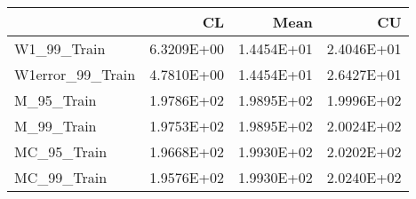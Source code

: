 \begin{tabular}{lrrr}
\toprule
{} &         CL &       Mean &         CU \\
\midrule
W1\_99\_Train      & 6.3209E+00 & 1.4454E+01 & 2.4046E+01 \\
W1error\_99\_Train & 4.7810E+00 & 1.4454E+01 & 2.6427E+01 \\
M\_95\_Train       & 1.9786E+02 & 1.9895E+02 & 1.9996E+02 \\
M\_99\_Train       & 1.9753E+02 & 1.9895E+02 & 2.0024E+02 \\
MC\_95\_Train      & 1.9668E+02 & 1.9930E+02 & 2.0202E+02 \\
MC\_99\_Train      & 1.9576E+02 & 1.9930E+02 & 2.0240E+02 \\
\bottomrule
\end{tabular}
